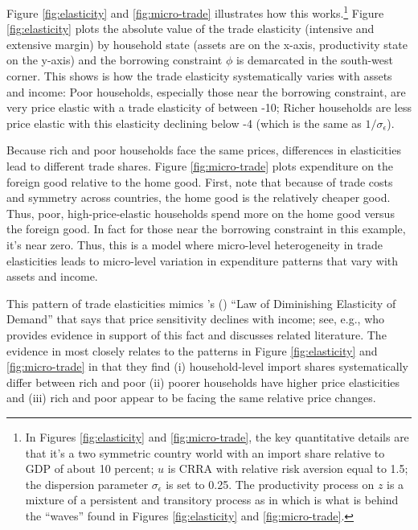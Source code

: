 \documentclass[12pt,pdftex]{article}
\def\citeapos#1{\citeauthor{#1}'s (\citeyear{#1})}
\begin{document}
\begin{onehalfspacing}
Figure \ref{fig:elasticity} and \ref{fig:micro-trade} illustrates how this works.\footnote{In Figures \ref{fig:elasticity} and \ref{fig:micro-trade}, the key quantitative details are that it's a two symmetric country world with an import share relative to GDP of about 10 percent; $u$ is CRRA with relative risk aversion equal to 1.5; the dispersion parameter $\sigma_{\epsilon}$ is set to 0.25. The productivity process on $z$ is a mixture of a persistent and transitory process as in \citet{} which is what is behind the ``waves'' found in Figures \ref{fig:elasticity} and \ref{fig:micro-trade}.} Figure \ref{fig:elasticity} plots the absolute value of the trade elasticity (intensive and extensive margin) by household state (assets are on the x-axis, productivity state on the y-axis) and the borrowing constraint $\phi$ is demarcated in the south-west corner. This shows is how the trade elasticity systematically varies with assets and income: Poor households, especially those near the borrowing constraint, are very price elastic with a trade elasticity of between -10; Richer households are less price elastic with this elasticity declining below -4 (which is the same as $1 / \sigma_{\epsilon}$).

Because rich and poor households face the same prices, differences in elasticities lead to different trade shares. Figure \ref{fig:micro-trade} plots expenditure on the foreign good relative to the home good. First, note that because of trade costs and symmetry across countries, the home good is the relatively cheaper good. Thus, poor, high-price-elastic households spend more on the home good versus the foreign good. In fact for those near the borrowing constraint in this example, it's near zero. Thus, this is a model where micro-level heterogeneity in trade elasticities leads to micro-level variation in expenditure patterns that vary with assets and income.

This pattern of trade elasticities mimics \citeapos{harrod1936trade} ``Law of Diminishing Elasticity of Demand'' that says that price sensitivity declines with income; see, e.g., \citet{sangani2022markups} who provides evidence in support of this fact and discusses related literature. The evidence in \citet*{auer2022unequal} most closely relates to the patterns in Figure \ref{fig:elasticity} and \ref{fig:micro-trade} in that they find (i) household-level import shares systematically differ between rich and poor (ii) poorer households have higher price elasticities and (iii) rich and poor appear to be facing the same relative price changes.


\end{onehalfspacing}
\end{document}
